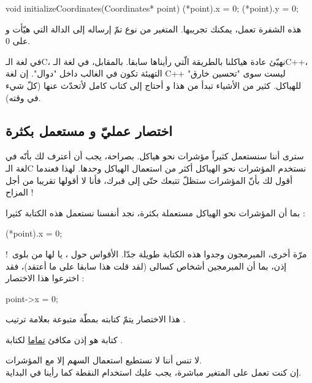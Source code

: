 \begin{Csource}
void initializeCoordinates(Coordinates* point)
{
	(*point).x = 0;
	(*point).y = 0;
}
\end{Csource}

هذه الشفرة تعمل، يمكنك تجريبها. المتغير من نوع
تمّ إرساله إلى الدالة التي هيّأت
و
على 0.

\begin{information}
في لغة الـ\textenglish{C}،
نهيّئ عادة هياكلنا بالطريقة الّتي رأيناها سابقا. بالمقابل، في لغة الـ\textenglish{C++}،
التهيئة تكون في الغالب داخل "دوال".
إن لغة
\textenglish{C++}
ليست سوى "تحسين خارق" للهياكل. كثير من الأشياء تبدأ من هذا و أحتاج إلى كتاب كامل لأتحدّث عنها (كلّ شيء في وقته).
\end{information}

\subsection{اختصار عمليّ و مستعمل بكثرة}

سترى أننا سنستعمل كثيراً مؤشرات نحو هياكل. بصراحة، يجب أن أعترف لك بأنّه
في لغة الـ\textenglish{C}
نستخدم  المؤشرات نحو الهياكل أكثر من استعمال الهياكل وحدها. لهذا فعندما أقول لك بأنّ المؤشرات ستظلّ تتبعك حتّى إلى قبرك، فأنا لا أقولها تقريبا من أجل المزاح !

بما أن المؤشرات نحو الهياكل مستعملة بكثرة، نجد أنفسنا نستعمل هذه الكتابة كثيرا :
\begin{Csource}
(*point).x = 0;
\end{Csource}

مرّة أخرى، المبرمجون وجدوا هذه الكتابة طويلة جدّا. الأقواس حول
،
يا لها من بلوى~! إذن، بما أن المبرمجين أشخاص كسالى (لقد قلت هذا سابقا على ما أعتقد)، فقد اخترعوا هذا الاختصار :

\begin{Csource}
point->x = 0;
\end{Csource}

هذا الاختصار يتمّ كتابته بمطّة
\InlineCode{-}
متبوعة بعلامة ترتيب
\InlineCode{>}.

كتابة
هو إذن مكافئ
\underline{تماما}
لكتابة
.

\begin{warning}
  لا تنس أننا لا نستطيع استعمال السهم إلا مع المؤشرات.\\
إن كنت تعمل على المتغير مباشرة، يجب عليك استخدام النقطة كما رأينا في البداية.
\end{warning}

